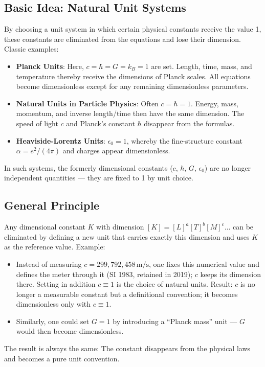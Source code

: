 	\subsection{Basic Idea: Natural Unit Systems}
	By choosing a unit system in which certain physical constants receive the value 1, these constants are eliminated from the equations and lose their dimension.
	Classic examples:
	\begin{itemize}
		\item \textbf{Planck Units}: Here, $c = \hbar = G = k_B = 1$ are set.
		Length, time, mass, and temperature thereby receive the dimensions of Planck scales. All equations become dimensionless except for any remaining dimensionless parameters.
		\item \textbf{Natural Units in Particle Physics}: Often $c = \hbar = 1$.
		Energy, mass, momentum, and inverse length/time then have the same dimension. The speed of light $c$ and Planck's constant $\hbar$ disappear from the formulas.
		\item \textbf{Heaviside-Lorentz Units}: $\epsilon_0 = 1$, whereby the fine-structure constant $\alpha = e^2/(4\pi)$ and charges appear dimensionless.
	\end{itemize}
	In such systems, the formerly dimensional constants ($c$, $\hbar$, $G$, $\epsilon_0$) are no longer independent quantities --- they are fixed to 1 by unit choice.
	
	\subsection{General Principle}
	Any dimensional constant $K$ with dimension $[K] = [L]^a [T]^b [M]^c \dots$ can be eliminated by defining a new unit that carries exactly this dimension and uses $K$ as the reference value.
	Example:
	\begin{itemize}
		\item Instead of measuring $c = 299{,}792{,}458\,\text{m/s}$, one fixes this numerical value and defines the meter through it (SI 1983, retained in 2019); $c$ keeps its dimension there. Setting in addition $c \equiv 1$ is the choice of natural units.
		Result: $c$ is no longer a measurable constant but a definitional convention; it becomes dimensionless only with $c \equiv 1$.
		\item Similarly, one could set $G = 1$ by introducing a ``Planck mass'' unit --- $G$ would then become dimensionless.
	\end{itemize}
	The result is always the same: The constant disappears from the physical laws and becomes a pure unit convention.
	
